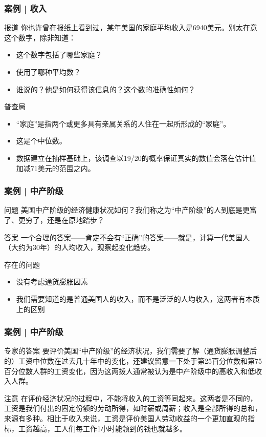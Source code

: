 \begin{frame}
  \frametitle{案例 | 收入}
  \begin{block}{报道}
    你也许曾在报纸上看到过，某年美国的家庭平均收入是6940美元。别太在意这个数字，除非知道：
    \begin{itemize}
      \item 这个数字包括了哪些家庭？
      \item 使用了哪种平均数？
      \item 谁说的？他是如何获得该信息的？这个数的准确性如何？
    \end{itemize}
  \end{block}
  \pause
  \begin{block}{普查局}
    \begin{itemize}
      \item “家庭”是指两个或更多具有亲属关系的人住在一起所形成的“家庭”。
      \item 这是个中位数。
      \item 数据建立在抽样基础上，该调查以19/20的概率保证真实的数值会落在估计值加减71美元的范围之内。
    \end{itemize}
  \end{block}
\end{frame}

\begin{frame}
  \frametitle{案例 | 中产阶级}
  \begin{block}{问题}
    美国中产阶级的经济健康状况如何？我们称之为“中产阶级”的人到底是更富了、更穷了，还是在原地踏步？
  \end{block}
  \pause
  \begin{block}{答案}
    一个合理的答案——肯定不会有“正确”的答案——就是，计算一代美国人（大约为30年）的人均收入，观察起变化趋势。
  \end{block}
  \pause
  \begin{block}{存在的问题}
    \begin{itemize}
      \item 没有考虑通货膨胀因素
      \item 我们需要知道的是普通美国人的收入，而不是泛泛的人均收入，这两者有本质上的区别
    \end{itemize}
  \end{block}
\end{frame}

\begin{frame}
  \frametitle{案例 | 中产阶级}
  \begin{block}{专家的答案}
    要评价美国“中产阶级”的经济状况，我们需要了解（通货膨胀调整后的）工资中位数在过去几十年中的变化，还建议留意一下处于第25百分位数和第75百分位数人群的工资变化，因为这两拨人通常被认为是中产阶级中的高收入和低收入人群。
  \end{block}
  \pause
  \begin{block}{注意}
    在评价经济状况的过程中，不能将收入的工资等同起来。这两者是不同的，工资是我们付出的固定份额的劳动所得，如时薪或周薪；收入是全部所得的总和，来源有多种。相比于收入来说，工资是评价美国人劳动收益的一个更加直观的指标，工资越高，工人们每工作1小时能领到的钱也就越多。
  \end{block}
\end{frame}

